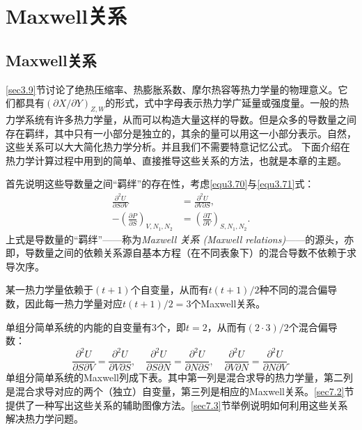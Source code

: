 
\chapter{Maxwell关系}
\label{chap7}

\section{Maxwell关系}
\label{sec7.1}
\ref{sec3.9}节讨论了绝热压缩率、热膨胀系数、摩尔热容等热力学量的物理意义。它们都具有$(\partial X / \partial Y)_{Z, W}$的形式，式中字母表示热力学广延量或强度量。一般的热力学系统有许多热力学量，从而可以构造大量这样的导数。但是众多的导数量之间存在羁绊，其中只有一小部分是独立的，其余的量可以用这一小部分表示。自然，这些关系可以大大简化热力学分析。并且我们不需要特意记忆公式。 下面介绍在热力学计算过程中用到的简单、直接推导这些关系的方法，也就是本章的主题。

首先说明这些导数量之间“羁绊”的存在性，考虑\eqref{equ3.70}与\eqref{equ3.71}式：
\begin{align}
	\frac{\partial^2 U}{\partial S \partial V} &= \frac{\partial^2 U}{\partial V \partial S}, \label{equ7.1} \\
	-\left( \frac{\partial P}{\partial S} \right)_{V, N_1, N_2} &= \left( \frac{\partial T}{\partial V} \right)_{S, N_1, N_2}. \label{equ7.2}
\end{align}
上式是导数量的“羁绊”——称为{\it Maxwell 关系 (Maxwell relations)}——的源头，亦即，导数量之间的依赖关系源自基本方程（在不同表象下）的混合导数不依赖于求导次序。

某一热力学量依赖于$(t + 1)$个自变量，从而有$t(t + 1)/2$种不同的混合偏导数，因此每一热力学量对应$t(t + 1)/2 = 3$个Maxwell关系。

单组分简单系统的内能的自变量有$3$个，即$t = 2$，从而有$(2 \cdot 3)/2$个混合偏导数：
\[
	\frac{\partial^2 U}{\partial S \partial V} = \frac{\partial^2 U}{\partial V \partial S}, \quad \frac{\partial^2 U}{\partial S \partial N} = \frac{\partial^2 U}{\partial N \partial S}, \quad \frac{\partial^2 U}{\partial V \partial N} = \frac{\partial^2 U}{\partial N \partial V}.
\]
单组分简单系统的Maxwell列成下表。其中第一列是混合求导的热力学量，第二列是混合求导对应的两个（独立）自变量，第三列是相应的Maxwell关系。\ref{sec7.2}节提供了一种写出这些关系的辅助图像方法。\ref{sec7.3}节举例说明如何利用这些关系解决热力学问题。

